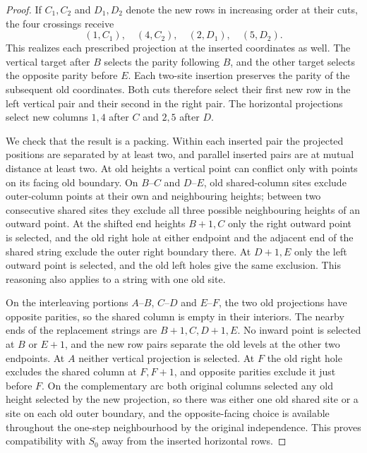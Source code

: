 \documentclass[11pt,colorlinks]{charlie}
\begin{document}
\begin{proof}
If $C_1,C_2$ and $D_1,D_2$ denote the new rows in increasing order at their cuts, the four crossings receive
\[
 (1,C_1),\quad(4,C_2),\quad(2,D_1),\quad(5,D_2).
\]
This realizes each prescribed projection at the inserted coordinates as well. The vertical target after $B$ selects the parity following $B$, and the other target selects the opposite parity before $E$. Each two-site insertion preserves the parity of the subsequent old coordinates. Both cuts therefore select their first new row in the left vertical pair and their second in the right pair. The horizontal projections select new columns $1,4$ after $C$ and $2,5$ after $D$.

We check that the result is a packing. Within each inserted pair the projected positions are separated by at least two, and parallel inserted pairs are at mutual distance at least two. At old heights a vertical point can conflict only with points on its facing old boundary. On $B$--$C$ and $D$--$E$, old shared-column sites exclude outer-column points at their own and neighbouring heights; between two consecutive shared sites they exclude all three possible neighbouring heights of an outward point. At the shifted end heights $B+1,C$ only the right outward point is selected, and the old right hole at either endpoint and the adjacent end of the shared string exclude the outer right boundary there. At $D+1,E$ only the left outward point is selected, and the old left holes give the same exclusion. This reasoning also applies to a string with one old site.

On the interleaving portions $A$--$B$, $C$--$D$ and $E$--$F$, the two old projections have opposite parities, so the shared column is empty in their interiors. The nearby ends of the replacement strings are $B+1,C,D+1,E$. No inward point is selected at $B$ or $E+1$, and the new row pairs separate the old levels at the other two endpoints. At $A$ neither vertical projection is selected. At $F$ the old right hole excludes the shared column at $F,F+1$, and opposite parities exclude it just before $F$. On the complementary arc both original columns selected any old height selected by the new projection, so there was either one old shared site or a site on each old outer boundary, and the opposite-facing choice is available throughout the one-step neighbourhood by the original independence. This proves compatibility with $S_0$ away from the inserted horizontal rows.


\end{proof}
\end{document}
